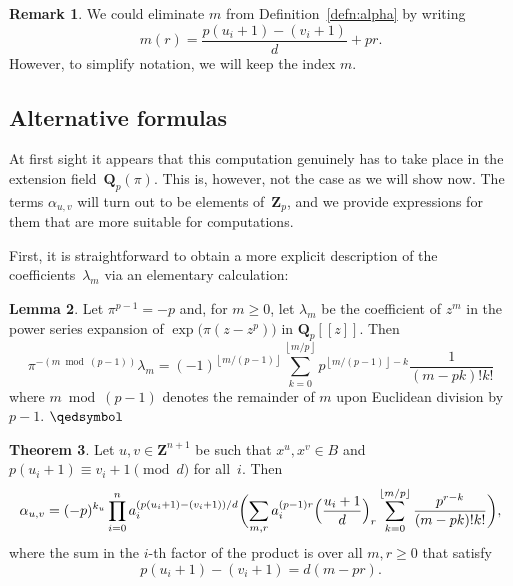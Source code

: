 \documentclass[a4paper,11pt]{article}
\numberwithin{equation}{section}
\providecommand{\floor}[1]{\left\lfloor#1\right\rfloor}   %
\newcommand{\ZZ}{\mathbf{Z}} %
\newcommand{\QQ}{\mathbf{Q}} %
\theoremstyle{definition}
\newtheorem{thm}{Theorem}[section]
\newtheorem{lem}[thm]{Lemma}
\newtheorem{rem}[thm]{Remark}
\begin{document}
\begin{rem}
We could eliminate $m$ from Definition~\ref{defn:alpha} by writing 
\[
m(r)=\frac{p(u_i+1) - (v_i+1)}{d}+pr.
\]
However, to simplify notation, we will keep the index $m$.
\end{rem}

\subsection{Alternative formulas}

At first sight it appears that this computation genuinely has to 
take place in the extension field~$\QQ_p(\pi)$.  This is, however, 
not the case as we will show now.  The terms $\alpha_{u,v}$ 
will turn out to be elements of~$\ZZ_p$, and we provide expressions 
for them that are more suitable for computations.

First, it is straightforward to obtain a more explicit description 
of the coefficients~$\lambda_m$ via an elementary calculation:

\begin{lem} \label{lem:lambdam}
Let $\pi^{p-1} = -p$ and, for $m \geq 0$, let $\lambda_m$ 
be the coefficient of $z^m$ in the power series expansion 
of $\exp \bigl( \pi (z - z^p) \bigr)$ in $\QQ_p[[z]]$.  Then 
\begin{equation*}
\pi^{- (m \bmod{(p-1)})} \lambda_m = (-1)^{\floor{m/(p-1)}} \sum_{k=0}^{\floor{m/p}} p^{\floor{m/(p-1)} - k} \frac{1}{(m-pk)! k!}
\end{equation*}
where $m \bmod{(p-1)}$ denotes the remainder of $m$ upon Euclidean 
division by $p-1$. \hfill $\qedsymbol$
\end{lem}

\begin{thm} \label{thm:alpha}
Let $u, v \in \ZZ^{n+1}$ be such that 
$x^u, x^v \in B$ and 
$p (u_i + 1) \equiv v_i + 1 \pmod{d}$ for all~$i$. 
Then 
\begin{equation*}
\alpha_{u,v} = (-p)^{k_u} \prod_{i=0}^n a_i^{(p (u_i + 1) - (v_i + 1))/d} 
    \biggl( \sum_{m,r} a_i^{(p-1)r} \Bigl( \frac{u_i+1}{d} \Bigr)_r 
        \sum_{k=0}^{\floor{m/p}} \frac{p^{r-k}}{(m-pk)!k!} \biggr),
\end{equation*}
where the sum in the $i$-th factor of the product is over all $m, r \geq 0$  
that satisfy
\[
p(u_i+1)-(v_i+1)=d(m-pr).
\]
\end{thm}
\end{document}
